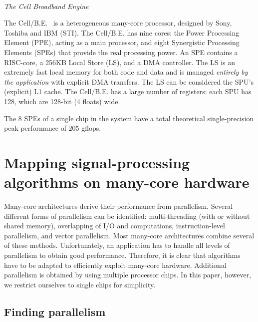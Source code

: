 \documentclass{article}
\newcommand{\longversion}[1]{}
\begin{document}
\noindent \\ \emph{The Cell Broadband Engine}

\noindent The \mbox{Cell/B.E.}~\cite{cell} is a
heterogeneous many-core processor, designed by Sony, Toshiba and IBM
(STI).  The \mbox{Cell/B.E.} has nine cores: the Power Processing
Element (PPE), acting as a main processor, and eight Synergistic
Processing Elements (SPEs) that provide the real processing power.
An SPE contains
a RISC-core, a 256KB Local Store (LS), and a DMA controller.
The LS is an extremely fast local memory for both code and data
and is managed \emph{entirely by the application} with explicit DMA
transfers.  The LS can be considered the SPU's (explicit) L1 cache.  The
\mbox{Cell/B.E.} has a large number of registers: each SPU has 128,
which are 128-bit (4 floats) wide.
\longversion{
 The SPU can dispatch two
instructions in each clock cycle using the two pipelines designated
\emph{even} and \emph{odd}. Most of the arithmetic instructions
execute on the even pipe, while most of the memory instructions
execute on the odd pipe.  For the performance evaluation, we use a QS21 Cell blade with two
\mbox{Cell/B.E.} processors.
}
The 8 SPEs of a single chip in the
system have a total theoretical single-precision peak performance of
205 gflops.


\section{Mapping signal-processing algorithms on many-core hardware}

Many-core architectures derive their performance from parallelism.
Several different forms of parallelism can be identified:
multi-threading (with or without shared memory), overlapping of I/O
and computations, instruction-level parallelism, and vector parallelism. Most
many-core architectures combine several of these methods.  
Unfortunately, an application has to handle all levels of parallelism to
obtain good performance.
Therefore, it is clear that algorithms have to be adapted to efficiently exploit
many-core hardware.
Additional parallelism is obtained by using multiple processor chips.
In this paper, however, we restrict ourselves to single chips for simplicity.



\subsection{Finding parallelism}
\end{document}
